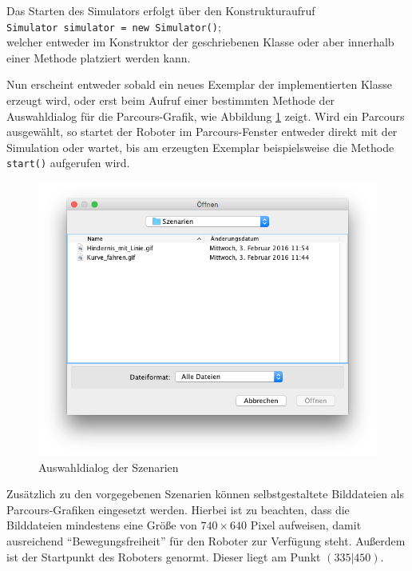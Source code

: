 \documentclass[paper=a4, DIV=calc, BCOR=12mm, twoside=on, onecolumn=on, open = right, titlepage =on, parskip =half-, headsepline = on, footsepline = off, chapterprefix = off, appendixprefix = on, fontsize = 12pt, numbers = noenddot, abstract = on]{scrbook}
\begin{document}

Das Starten des Simulators erfolgt über den Konstrukturaufruf\\
\hspace*{2ex} \texttt{Simulator simulator = new Simulator()};\\
welcher entweder im Konstruktor der geschriebenen Klasse oder aber innerhalb einer Methode platziert werden kann.

Nun erscheint entweder sobald ein neues Exemplar der implementierten Klasse erzeugt wird, oder erst beim Aufruf einer bestimmten Methode der Auswahldialog für die Parcours-Grafik, wie Abbildung \ref{fig:auswahl_szenarien} zeigt. Wird ein Parcours ausgewählt, so startet der Roboter im Parcours-Fenster entweder direkt mit der Simulation oder wartet, bis am erzeugten Exemplar beispielsweise die Methode \texttt{start()} aufgerufen wird.

\begin{figure}[htb]
\centering
\includegraphics[width=\textwidth]{images/dialog_szenarien.png}
\caption{Auswahldialog der Szenarien}
\label{fig:auswahl_szenarien}
\end{figure}


Zusätzlich zu den vorgegebenen Szenarien können selbstgestaltete Bilddateien als Parcours-Grafiken eingesetzt werden. Hierbei ist zu beachten, dass die Bilddateien mindestens eine Größe von $740 \times 640$ Pixel aufweisen, damit ausreichend "`Bewegungsfreiheit"' für den Roboter zur Verfügung steht. Außerdem ist der Startpunkt des Roboters genormt. Dieser liegt am Punkt $\left( 335 \vert 450 \right)$.
\end{document}

